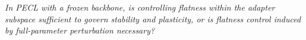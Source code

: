 \documentclass{article}
\theoremstyle{plain}
\theoremstyle{definition}
\theoremstyle{remark}
\begin{document}
\emph{In PECL with a frozen backbone, is controlling flatness within the adapter subspace sufficient to govern stability and plasticity, or is flatness control induced by full-parameter perturbation necessary?}







\end{document}
